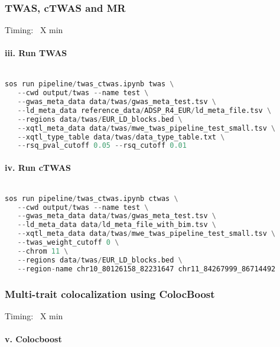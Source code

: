 \documentclass[12pt]{article}
\begin{document}
\subsubsection*{TWAS, cTWAS and MR}
Timing: ~X min

\paragraph*{iii. Run TWAS}


\noindent
\begin{lstlisting}[language=Python]

sos run pipeline/twas_ctwas.ipynb twas \
   --cwd output/twas --name test \
   --gwas_meta_data data/twas/gwas_meta_test.tsv \
   --ld_meta_data reference_data/ADSP_R4_EUR/ld_meta_file.tsv \
   --regions data/twas/EUR_LD_blocks.bed \
   --xqtl_meta_data data/twas/mwe_twas_pipeline_test_small.tsv \
   --xqtl_type_table data/twas/data_type_table.txt \
   --rsq_pval_cutoff 0.05 --rsq_cutoff 0.01

\end{lstlisting}




\paragraph*{iv. Run cTWAS}


\noindent
\begin{lstlisting}[language=Python]

sos run pipeline/twas_ctwas.ipynb ctwas \
   --cwd output/twas --name test \
   --gwas_meta_data data/twas/gwas_meta_test.tsv \
   --ld_meta_data data/ld_meta_file_with_bim.tsv \
   --xqtl_meta_data data/twas/mwe_twas_pipeline_test_small.tsv \
   --twas_weight_cutoff 0 \
   --chrom 11 \
   --regions data/twas/EUR_LD_blocks.bed \
   --region-name chr10_80126158_82231647 chr11_84267999_86714492

\end{lstlisting}




\subsubsection*{Multi-trait colocalization using ColocBoost}
Timing: ~X min

\paragraph*{v. Colocboost}
\end{document}
